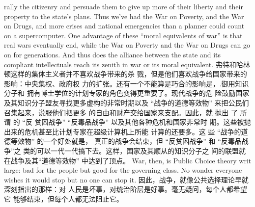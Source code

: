 \begin{paracol}{2}
rally the citizenry and persuade them to give up more of their
liberty and their property to the state's plans. Thus we've had
the War on Poverty, and the War on Drugs, and more crises and
national emergencies than a planner could count on a supercomputer. One advantage of these ``moral equivalents of war'' is
that real wars eventually end, while the War on Poverty and the
War on Drugs can go on for generations. And thus does the alliance between the state and its compliant intellectuals reach its
zenith in war or its moral equivalent.
\switchcolumn
弗特和哈林顿这样的集体主义者并不喜欢战争带来的杀
戮，但是他们喜欢战争给国家带来的影响：中央集权、政府权
力的扩张。还有一个不能算是巧合的影响是，.御用知识分子和
拥有博士学位的计划专家的角色变得更重要了。现代战争的危
险鼓励国家及其知识分子盟友寻找更多虚构的非常时期以及
“战争的道德等效物” 来把公民们召集起来，说服他们把更多
的自由和财产交给国家来支配。因此，就 抛出 了 所 谓 的 “反
贫困战争” “反毒品战争” 以及其他各种危机和国家非常时
期。这些被抛出来的危机甚至比计划专家在超级计算机上所能
计算的还要多。这 些 “战争的道德等效物” 的一个好处就是，
真正的战争会结束，但 “反贫困战争” 和 “反毒品战争”之
类的可以一代一代搞下去。这样，国家及其顺从的知识分子之
间的联盟就在战争及其“道德等效物” 中达到了顶点。
\switchcolumn*
War, then, is Public Choice theory writ large: bad for the
people but good for the governing class. No wonder everyone
wishes it would stop but no one can stop it.
\switchcolumn
因此，战争，就像公共选择理论早就深刻指出的那样：对
人民是坏事，对统治阶层是好事。毫无疑问，每个人都希望它
能够结束，但每个人都无法阻止它。

\end{paracol}